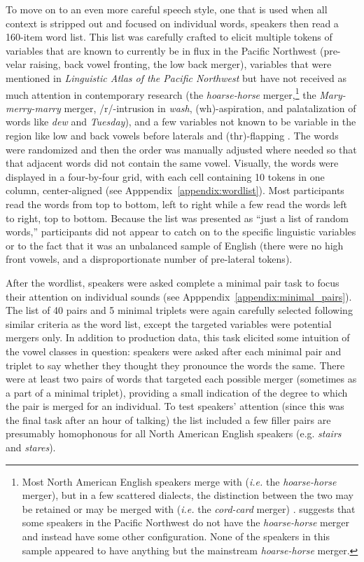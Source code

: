 To move on to an even more careful speech style, one that is used when all context is stripped out and focused on individual words, speakers then read a 160-item word list. This list was carefully crafted to elicit multiple tokens of variables that are known to currently be in flux in the Pacific Northwest (pre-velar raising, back vowel fronting, the low back merger), variables that were mentioned in \textit{Linguistic Atlas of the Pacific Northwest} but have not received as much attention in contemporary research (the \textit{hoarse-horse} merger,\footnote{Most North American English speakers merge \north with \force (\textit{i.e.} the \textit{hoarse-horse} merger), but in a few scattered dialects, the distinction between the two may be retained or \north may be merged with \start (\textit{i.e.} the \textit{cord-card} merger) \citep{labov_ash_boberg_2006_anae}. \citet[560]{reed_1961} suggests that some speakers in the Pacific Northwest do not have the \textit{hoarse-horse} merger and instead have some other configuration. None of the speakers in this sample appeared to have anything but the mainstream \textit{hoarse-horse} merger.} the \textit{Mary-merry-marry} merger, /r/-intrusion in \textit{wash}, (wh)-aspiration, and palatalization of words like \textit{dew} and \textit{Tuesday}), and a few variables not known to be variable in the region like low and back vowels before laterals \citep[cf.][]{stanley_2017_ADS} and (thr)-flapping \citep[cf.][]{stanley_forthcoming_thr}. The words were randomized and then the order was manually adjusted where needed so that that adjacent words did not contain the same vowel. Visually, the words were displayed in a four-by-four grid, with each cell containing 10 tokens in one column, center-aligned (see Apppendix~\ref{appendix:wordlist}). Most participants read the words from top to bottom, left to right while a few read the words left to right, top to bottom. Because the list was presented as ``just a list of random words,'' participants did not appear to catch on to the specific linguistic variables or to the fact that it was an unbalanced sample of English (there were no high front vowels, and a disproportionate number of pre-lateral tokens).

After the wordlist, speakers were asked complete a minimal pair task to focus their attention on individual sounds (see Apppendix~\ref{appendix:minimal_pairs}). The list of 40 pairs and 5 minimal triplets were again carefully selected following similar criteria as the word list, except the targeted variables were potential mergers only. In addition to production data, this task elicited some intuition of the vowel classes in question: speakers were asked after each minimal pair and triplet to say whether they thought they pronounce the words the same. There were at least two pairs of words that targeted each possible merger (sometimes as a part of a minimal triplet), providing a small indication of the degree to which the pair is merged for an individual. To test speakers’ attention (since this was the final task after an hour of talking) the list included a few filler pairs are presumably homophonous for all North American English speakers (e.g. \textit{stairs} and \textit{stares}).

